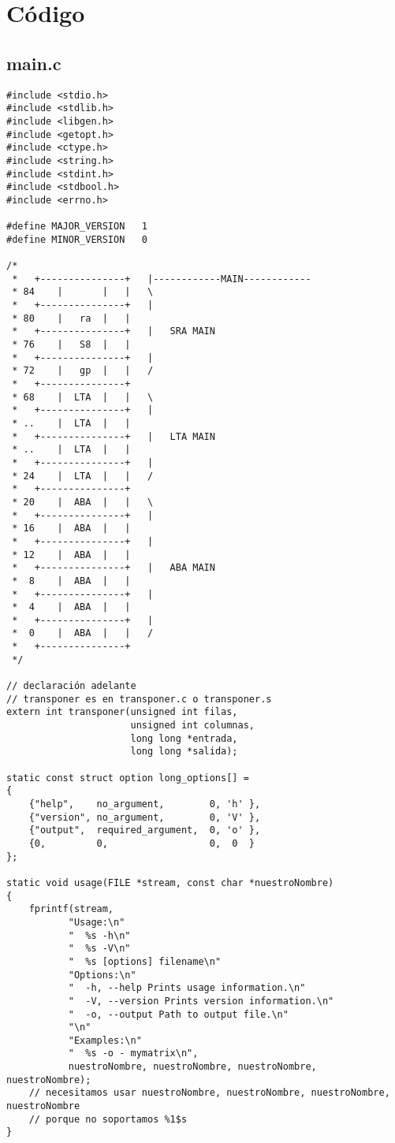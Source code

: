 \documentclass[a4paper]{article}
\begin{document}
\section{Código}

\subsection{main.c}
\begin{verbatim}
#include <stdio.h>
#include <stdlib.h>
#include <libgen.h>
#include <getopt.h>
#include <ctype.h>
#include <string.h>
#include <stdint.h>
#include <stdbool.h>
#include <errno.h>

#define MAJOR_VERSION   1
#define MINOR_VERSION   0

/*
 *   +---------------+   |------------MAIN------------
 * 84    |       |   |   \
 *   +---------------+   |
 * 80    |   ra  |   |
 *   +---------------+   |   SRA MAIN
 * 76    |   S8  |   |
 *   +---------------+   |
 * 72    |   gp  |   |   /
 *   +---------------+
 * 68    |  LTA  |   |   \
 *   +---------------+   |
 * ..    |  LTA  |   |
 *   +---------------+   |   LTA MAIN
 * ..    |  LTA  |   |
 *   +---------------+   |
 * 24    |  LTA  |   |   /
 *   +---------------+
 * 20    |  ABA  |   |   \
 *   +---------------+   |
 * 16    |  ABA  |   |
 *   +---------------+   |
 * 12    |  ABA  |   |
 *   +---------------+   |   ABA MAIN
 *  8    |  ABA  |   |
 *   +---------------+   |
 *  4    |  ABA  |   |
 *   +---------------+   |
 *  0    |  ABA  |   |   /
 *   +---------------+
 */

// declaración adelante
// transponer es en transponer.c o transponer.s
extern int transponer(unsigned int filas,
                      unsigned int columnas,
                      long long *entrada,
                      long long *salida);

static const struct option long_options[] =
{
    {"help",    no_argument,        0, 'h' },
    {"version", no_argument,        0, 'V' },
    {"output",  required_argument,  0, 'o' },
    {0,         0,                  0,  0  }
};

static void usage(FILE *stream, const char *nuestroNombre)
{
    fprintf(stream,
           "Usage:\n"
           "  %s -h\n"
           "  %s -V\n"
           "  %s [options] filename\n"
           "Options:\n"
           "  -h, --help Prints usage information.\n"
           "  -V, --version Prints version information.\n"
           "  -o, --output Path to output file.\n"
           "\n"
           "Examples:\n"
           "  %s -o - mymatrix\n",
           nuestroNombre, nuestroNombre, nuestroNombre, nuestroNombre);
    // necesitamos usar nuestroNombre, nuestroNombre, nuestroNombre, nuestroNombre
    // porque no soportamos %1$s
}


\end{verbatim}
\end{document}
